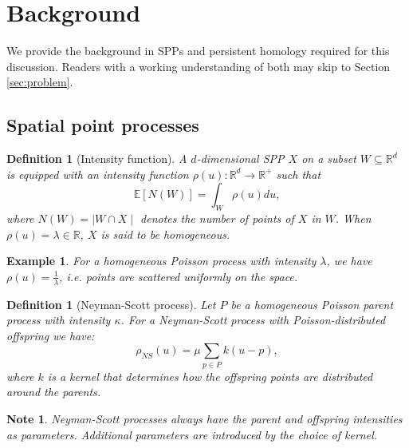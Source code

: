 \documentclass[11pt,letterpaper]{article}
\newcommand{\R}{\mathbb{R}}
\newcommand{\E}{\mathbb{E}}
\newcommand{\1}{\mathds{1}}
\newcommand{\kpar}{\kappa}
\newcommand{\mo}{\mu}
\theoremstyle{plain}
\theoremstyle{definitioncolon}
\newtheorem{definition}[theorem]{Definition}
\newtheorem*{note}{Note}
\newtheorem*{example}{Example}
\begin{document}
\section{Background}
\label{sec:background}

We provide the background in SPPs and persistent homology required for this
discussion. Readers with a working understanding of both may skip to
Section \ref{sec:problem}.

\subsection{Spatial point processes}
\label{ssec:spp}

    \begin{definition}[Intensity function]
    \label{def:intensity}
        A $d$-dimensional SPP $X$ on a subset $W \subseteq \R^d$ is equipped
        with an intensity function $\rho(u): \R^d \rightarrow \R^+$ such that
            \[
            \E[N(W)] = \int_W \rho(u) du,
            \]
        where $N(W) = \mid W \cap X \mid$ denotes the number of points of $X$
        in $W$. When $\rho(u) = \lambda \in \R$, $X$ is said to be
        \emph{homogeneous}.
    \end{definition}

    \begin{example}
        For a homogeneous Poisson process with intensity $\lambda$, we have
        $\rho(u) = \frac{1}{\lambda}$, i.e. points are scattered uniformly on
        the space.
    \end{example}

    \begin{definition}[Neyman-Scott process]
    \label{def:ns}
        Let $P$ be a homogeneous Poisson \emph{parent} process with intensity
        $\kpar$. For a Neyman-Scott process with Poisson-distributed offspring
        we have:
            \[
            \rho_{NS}(u) = \mo \sum_{p \in P} k(u - p),
            \]
        where $k$ is a kernel that determines how the \emph{offspring} points
        are distributed around the parents.
    \end{definition}

    \begin{note}
        Neyman-Scott processes always have the parent and offspring intensities
        as parameters. Additional parameters are introduced by the choice of
        kernel.
    \end{note}
\end{document}
